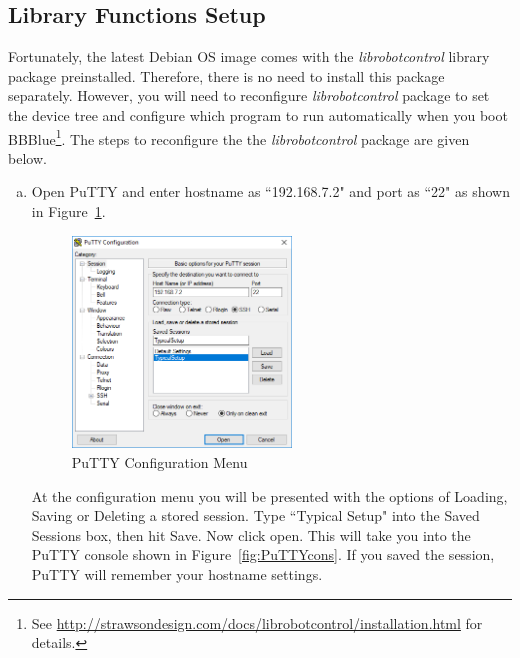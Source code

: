 \subsection{Library Functions Setup}
Fortunately, the latest Debian OS image comes with the \emph{librobotcontrol} library package preinstalled. Therefore, there is no need to install this package separately. However, you will need to reconfigure \emph{librobotcontrol} package to set the device tree and configure which program to run automatically when you boot BBBlue\footnote{See \url{http://strawsondesign.com/docs/librobotcontrol/installation.html} for details.}. The steps to reconfigure the the \emph{librobotcontrol} package are given below. 

\begin{enumerate}[a)]
    \item Open PuTTY and enter hostname as ``192.168.7.2" and port as ``22" as shown in Figure~\ref{fig:PuTTYLog}. %
    \begin{figure}
        \centering
        \includegraphics[width= 0.55\textwidth]{figs/img/Lab0/PuTTY.png}
        \caption{PuTTY Configuration Menu}
        \label{fig:PuTTYLog}
    \end{figure}    
    At the configuration menu you will be presented with the options of Loading, Saving or Deleting a stored session. 
    Type ``Typical Setup" into the Saved Sessions box, then hit Save. Now click open. This will take you into the PuTTY console shown in Figure~\ref{fig:PuTTYcons}. If you saved the session, PuTTY will remember your hostname settings.
    

\end{enumerate}
